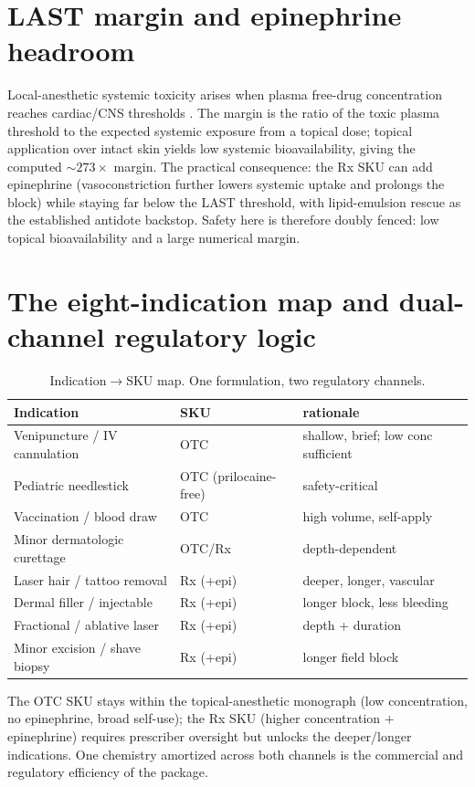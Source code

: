 \documentclass[11pt,a4paper]{article}
\begin{document}
\section{LAST margin and epinephrine headroom}
\label{sec:last}
Local-anesthetic systemic toxicity arises when plasma free-drug concentration
reaches cardiac/CNS thresholds \citep{covino1986,weinberg}. The margin is the
ratio of the toxic plasma threshold to the expected systemic exposure from a
topical dose; topical application over intact skin yields low systemic
bioavailability, giving the computed $\sim273\times$ margin. The practical
consequence: the Rx SKU can add epinephrine (vasoconstriction further lowers
systemic uptake and prolongs the block) while staying far below the LAST
threshold, with lipid-emulsion rescue \citep{weinberg2010} as the established
antidote backstop. Safety here is therefore doubly fenced: low topical
bioavailability and a large numerical margin.

\section{The eight-indication map and dual-channel regulatory logic}
\label{sec:indications}
\begin{table}[h]
\centering
\caption{Indication$\to$SKU map. One formulation, two regulatory channels.}
\label{tab:ind}
\small
\begin{tabular}{@{}lll@{}}
\toprule
Indication & SKU & rationale \\
\midrule
Venipuncture / IV cannulation & OTC & shallow, brief; low conc sufficient \\
Pediatric needlestick & OTC (prilocaine-free) & safety-critical \\
Vaccination / blood draw & OTC & high volume, self-apply \\
Minor dermatologic curettage & OTC/Rx & depth-dependent \\
Laser hair / tattoo removal & Rx (+epi) & deeper, longer, vascular \\
Dermal filler / injectable & Rx (+epi) & longer block, less bleeding \\
Fractional / ablative laser & Rx (+epi) & depth + duration \\
Minor excision / shave biopsy & Rx (+epi) & longer field block \\
\bottomrule
\end{tabular}
\end{table}
The OTC SKU stays within the topical-anesthetic monograph (low concentration,
no epinephrine, broad self-use); the Rx SKU (higher concentration $+$
epinephrine) requires prescriber oversight but unlocks the deeper/longer
indications. One chemistry amortized across both channels is the commercial and
regulatory efficiency of the package.
\end{document}
